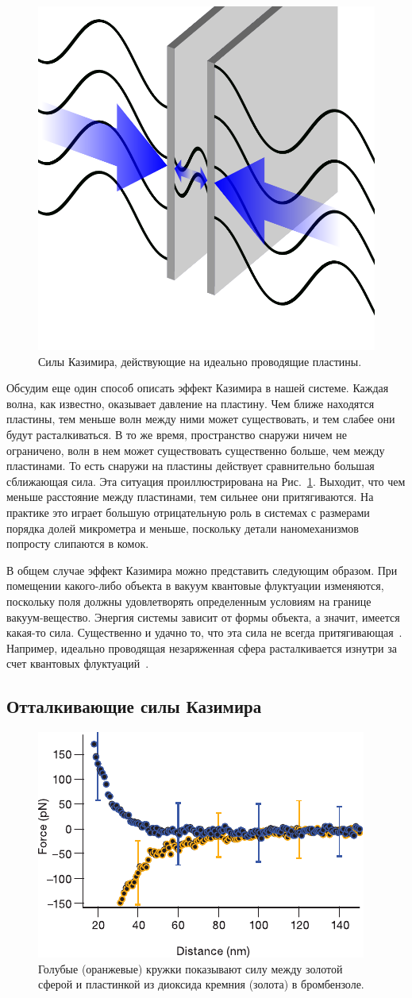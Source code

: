 \begin{figure}[t!]
\includegraphics[width=.4\linewidth]{figs/Casimir-plates.pdf}
\caption{Силы Казимира, действующие на идеально проводящие пластины.}
\label{fig:plates}
\end{figure}

Обсудим еще один способ описать эффект Казимира в нашей системе. 
Каждая волна, как известно, оказывает давление на пластину. 
Чем ближе находятся пластины, тем меньше волн между ними может существовать, и тем слабее они будут расталкиваться. 
В то же время, пространство снаружи ничем не ограничено, волн в нем может существовать существенно больше, чем между пластинами. 
То есть снаружи на пластины действует сравнительно большая сближающая сила. 
Эта ситуация проиллюстрирована на Рис.~\ref{fig:plates}. 
Выходит, что чем меньше расстояние между пластинами, тем сильнее они притягиваются. 
На практике это играет большую отрицательную роль в системах с размерами порядка долей микрометра и меньше, поскольку детали наномеханизмов попросту слипаются в комок. 

В общем случае эффект Казимира можно представить следующим образом. 
При помещении какого-либо объекта в вакуум квантовые флуктуации изменяются, поскольку поля должны удовлетворять определенным условиям на границе вакуум-вещество. 
Энергия системы зависит от формы объекта, а значит, имеется какая-то сила. 
Существенно и удачно то, что эта сила не всегда притягивающая~\cite{General.van-der-Waals}. 
Например, идеально проводящая незаряженная сфера расталкивается изнутри за счет квантовых флуктуаций~\cite{SphericalShell}. 

\subsection{Отталкивающие силы Казимира}

\begin{figure}
\includegraphics[width=.5\linewidth]{figs/Repulsive-graph}
\caption{Голубые (оранжевые) кружки показывают силу между золотой сферой и пластинкой из диоксида кремния (золота) в бромбензоле.}
\label{fig:rep.graph}
\end{figure}

